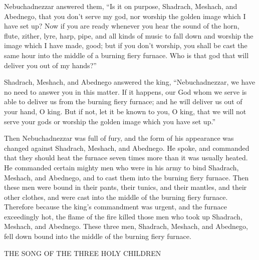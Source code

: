 {Nebuchadnezzar answered them, “Is it on purpose, Shadrach, Meshach, and Abednego, that you don’t serve my god, nor worship the golden image which I have set up?
Now if you are ready whenever you hear the sound of the horn, flute, zither, lyre, harp, pipe, and all kinds of music to fall down and worship the image which I have made, good; but if you don’t worship, you shall be cast the same hour into the middle of a burning fiery furnace. Who is that god that will deliver you out of my hands?”
\par }{\PP {}Shadrach, Meshach, and Abednego answered the king, “Nebuchadnezzar, we have no need to answer you in this matter.
If it happens, our God whom we serve is able to deliver us from the burning fiery furnace; and he will deliver us out of your hand, O king.
But if not, let it be known to you, O king, that we will not serve your gods or worship the golden image which you have set up.”
\par }{\PP {}Then Nebuchadnezzar was full of fury, and the form of his appearance was changed against Shadrach, Meshach, and Abednego. He spoke, and commanded that they should heat the furnace seven times more than it was usually heated.
He commanded certain mighty men who were in his army to bind Shadrach, Meshach, and Abednego, and to cast them into the burning fiery furnace.
Then these men were bound in their pants, their tunics, and their mantles, and their other clothes, and were cast into the middle of the burning fiery furnace.
Therefore because the king’s commandment was urgent, and the furnace exceedingly hot, the flame of the fire killed those men who took up Shadrach, Meshach, and Abednego.
These three men, Shadrach, Meshach, and Abednego, fell down bound into the middle of the burning fiery furnace.
\par }{\SH THE SONG OF THE THREE HOLY CHILDREN
}
